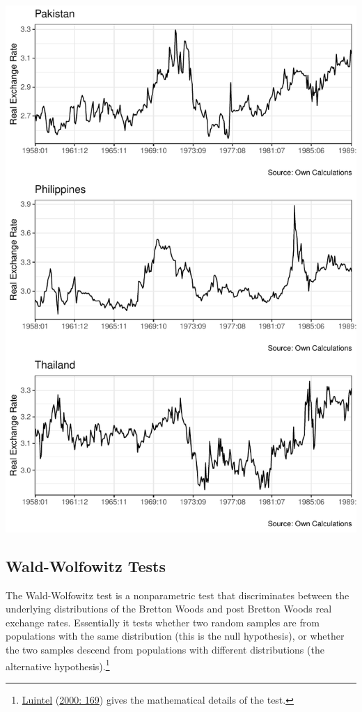 \documentclass[11pt,preprint, authoryear]{elsarticle}
\let\origfigure\figure
\let\endorigfigure\endfigure
\renewenvironment{figure}[1][2] {
    \expandafter\origfigure\expandafter[H]
} {
    \endorigfigure
}
\numberwithin{equation}{section}
\numberwithin{figure}{section}
\numberwithin{table}{section}
\let\rmarkdownfootnote\footnote%
\def\footnote{\protect\rmarkdownfootnote}
\begin{document}
\begin{figure}[H]

{\centering \includegraphics{20346212_files/figure-latex/Figure2-1} 

}

\caption{Plot of Real Exchange Rates over Time\label{Figure1}}\label{fig:Figure2}
\end{figure}

\hypertarget{wald-wolfowitz-tests}{%
\subsection{\texorpdfstring{Wald-Wolfowitz Tests
\label{wald}}{Wald-Wolfowitz Tests }}\label{wald-wolfowitz-tests}}

The Wald-Wolfowitz test is a nonparametric test that discriminates
between the underlying distributions of the Bretton Woods and post
Bretton Woods real exchange rates. Essentially it tests whether two
random samples are from populations with the same distribution (this is
the null hypothesis), or whether the two samples descend from
populations with different distributions (the alternative
hypothesis).\footnote{\protect\hyperlink{ref-Kul}{Luintel}
  (\protect\hyperlink{ref-Kul}{2000: 169}) gives the mathematical
  details of the test.}
\end{document}
